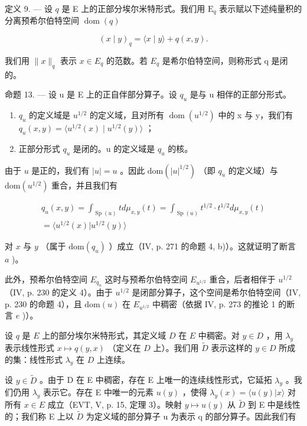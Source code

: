 定义 9. --- 设 \(q\) 是 E 上的正部分埃尔米特形式。我们用 \(\mathrm{E}_q\) 表示赋以下述纯量积的分离预希尔伯特空间 \(\operatorname{dom}(q)\)

\[
(x \mid y) _ {q} = \langle x \mid y \rangle + q (x, y).
\]

我们用 \(\|x\|_{q}\) 表示 \(x \in E_{q}\) 的范数。若 \(E_{q}\) 是希尔伯特空间，则称形式 q 是闭的。

命题 13. --- 设 u 是 E 上的正自伴部分算子。设 \(q_{u}\) 是与 u 相伴的正部分形式。

\begin{enumerate}
\def\labelenumi{\alph{enumi})}
\item
  \(q_{u}\) 的定义域是 \(u^{1/2}\) 的定义域，且对所有 \(\operatorname{dom}(u^{1/2})\) 中的 x 与 y，我们有 \(q_{u}(x,y)=\langle u^{1/2}(x)\mid u^{1/2}(y)\rangle\) ；
\item
  正部分形式 \(q_{u}\) 是闭的。u 的定义域是 \(q_{u}\) 的核。
\end{enumerate}

由于 \(u\) 是正的，我们有 \(|u| = u\) 。因此 \(\mathrm{dom}(|u|^{1/2})\) （即 \(q_u\) 的定义域）与 \(\mathrm{dom}(u^{1/2})\) 重合，并且我们有

\[
\begin{array}{c} q _ {u} (x, y) = \int_ {\operatorname{Sp} (u)} t d \mu_ {x, y} (t) = \int_ {\operatorname{Sp} (u)} t ^ {1 / 2} \cdot t ^ {1 / 2} d \mu_ {x, y} (t) \\ = \langle u ^ {1 / 2} (x) | u ^ {1 / 2} (y) \rangle \end{array}
\]

对 \(x\) 与 \(y\) （属于 \(\mathrm{dom}(q_u)\) ）成立（IV, p. 271 的命题 4, b)）。这就证明了断言 \(a\) )。

此外，预希尔伯特空间 \(E_{q_{u}}\) 这时与预希尔伯特空间 \(E_{u^{1/2}}\) 重合，后者相伴于 \(u^{1/2}\) （IV, p. 230 的定义 4）。由于 \(u^{1/2}\) 是闭部分算子，这个空间是希尔伯特空间（IV, p. 230 的命题 4），且 \(\text{dom}(u)\) 在 \(E_{u^{1/2}}\) 中稠密（依据 IV, p. 273 的推论 1 的断言 \(e\) )）。

设 \(q\) 是 \(E\) 上的部分埃尔米特形式，其定义域 \(D\) 在 \(E\) 中稠密。对 \(y \in D\) ，用 \(\lambda_y\) 表示线性形式 \(x \mapsto q(y, x)\) （定义在 \(D\) 上）。我们用 \(\widetilde{D}\) 表示这样的 \(y \in D\) 所成的集：线性形式 \(\lambda_y\) 在 \(D\) 上连续。

设 \(y \in \widetilde{D}\) 。由于 D 在 E 中稠密，存在 E 上唯一的连续线性形式，它延拓 \(\lambda_{y}\) 。我们仍用 \(\lambda_{y}\) 表示它。存在 E 中唯一的元素 \(u(y)\) ，使得 \(\lambda_{y}(x) = \langle u(y) | x \rangle\) 对所有 \(x \in E\) 成立（EVT, V, p. 15, 定理 3）。映射 \(y \mapsto u(y)\) 从 \(\widetilde{D}\) 到 E 中是线性的；我们称 E 上以 \(\widetilde{D}\) 为定义域的部分算子 u 为表示 q 的部分算子。因此我们有

